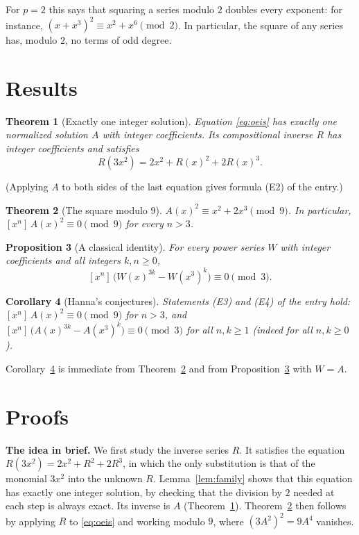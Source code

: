 \documentclass[11pt,a4paper]{article}
\newtheorem{theorem}{Theorem}[section]
\newtheorem{corollary}[theorem]{Corollary}
\newtheorem{proposition}[theorem]{Proposition}
\theoremstyle{definition}
\theoremstyle{remark}
\newcommand{\coeff}[2]{[x^{#1}]\,#2}
\newcommand{\para}[1]{\par\medskip\noindent\textbf{#1}\enspace}
\begin{document}
For $p=2$ this says that squaring a series modulo $2$ doubles every exponent: for instance,
$(x+x^3)^2\equiv x^2+x^6\pmod2$. In particular, the square of any series has, modulo $2$, no terms of odd degree.

\section{Results}\label{sec:results}

\begin{theorem}[Exactly one integer solution]\label{thm:exist}
Equation \eqref{eq:oeis} has exactly one normalized solution $A$ with integer coefficients. Its compositional inverse
$R$ has integer coefficients and satisfies
\[
R(3x^2)=2x^2+R(x)^2+2R(x)^3 .
\]
\end{theorem}
(Applying $A$ to both sides of the last equation gives formula (E2) of the entry.)

\begin{theorem}[The square modulo $9$]\label{thm:nine}
$A(x)^2\equiv x^2+2x^3\pmod 9$. In particular, $\coeff{n}{A(x)^2}\equiv0\pmod 9$ for every $n>3$.
\end{theorem}

\begin{proposition}[A classical identity]\label{prop:frob}
For every power series $W$ with integer coefficients and all integers $k,n\ge0$,
\[
\coeff{n}{\bigl(W(x)^{3k}-W(x^3)^k\bigr)}\equiv0\pmod 3 .
\]
\end{proposition}

\begin{corollary}[Hanna's conjectures]\label{cor:conj}
Statements (E3) and (E4) of the entry hold: $\coeff{n}{A(x)^2}\equiv0\pmod9$ for $n>3$, and
$\coeff{n}{\bigl(A(x)^{3k}-A(x^3)^k\bigr)}\equiv0\pmod3$ for all $n,k\ge1$ (indeed for all $n,k\ge0$).
\end{corollary}
Corollary~\ref{cor:conj} is immediate from Theorem~\ref{thm:nine} and from Proposition~\ref{prop:frob} with $W=A$.

\section{Proofs}\label{sec:proofs}

\para{The idea in brief.} We first study the inverse series $R$. It satisfies the equation $R(3x^2)=2x^2+R^2+2R^3$, in which the only
substitution is that of the monomial $3x^2$ into the unknown $R$. Lemma~\ref{lem:family} shows that this equation has exactly one integer
solution, by checking that the division by $2$ needed at each step is always exact. Its inverse is $A$
(Theorem~\ref{thm:exist}). Theorem~\ref{thm:nine} then follows by applying $R$ to \eqref{eq:oeis} and working
modulo $9$, where $(3A^2)^2=9A^4$ vanishes.
\end{document}
